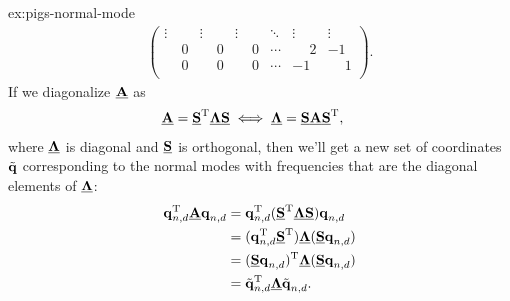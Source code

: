 \begin{DefAnswer}{ex:pigs-normal-mode}
\begin{align}
\begin{pmatrix}
				\vdots & \vdots & \vdots & \ddots & \vdots & \vdots \\
				\phantom{-}0 & \phantom{-}0 & \phantom{-}0 & \cdots & \phantom{-}2 & -1 \\
				\phantom{-}0 & \phantom{-}0 & \phantom{-}0 & \cdots & -1 & \phantom{-}1 \\
			\end{pmatrix}.
	\end{align}
	If we diagonalize $\underline{\bm{\mathbf{A}}}$ as
	\begin{align}
		\mat{A}
		= \mat{S}\trans \mat{\Lambda} \mat{S}
		&\iff
		\mat{\Lambda}
		= \mat{S} \mat{A} \mat{S}\trans,
			\label{eq:nm-diagonalization}
	\end{align}
	where $\underline{\bm{\mathbf{\Lambda}}}$ is diagonal and $\underline{\bm{\mathbf{S}}}$ is orthogonal, then we'll get a new set of coordinates $\tilde{\bm{\mathbf{q}}}$ corresponding to the normal modes with frequencies that are the diagonal elements of $\underline{\bm{\mathbf{\Lambda}}}$:
	\begin{subequations}
	\begin{align}
		\bm{\mathbf{q}}_{n,d}^\mathrm{T} \underline{\bm{\mathbf{A}}} \bm{\mathbf{q}}_{n,d}
		&= \bm{\mathbf{q}}_{n,d}^\mathrm{T} (\underline{\bm{\mathbf{S}}}^\mathrm{T} \underline{\bm{\mathbf{\Lambda}}} \underline{\bm{\mathbf{S}}}) \bm{\mathbf{q}}_{n,d} \\
		&= (\bm{\mathbf{q}}_{n,d}^\mathrm{T} \underline{\bm{\mathbf{S}}}^\mathrm{T}) \underline{\bm{\mathbf{\Lambda}}} (\underline{\bm{\mathbf{S}}} \bm{\mathbf{q}}_{n,d}) \\
		&= (\underline{\bm{\mathbf{S}}} \bm{\mathbf{q}}_{n,d})^\mathrm{T} \underline{\bm{\mathbf{\Lambda}}} (\underline{\bm{\mathbf{S}}} \bm{\mathbf{q}}_{n,d}) \\
		&= \tilde{\bm{\mathbf{q}}}_{n,d}^\mathrm{T} \underline{\bm{\mathbf{\Lambda}}} \tilde{\bm{\mathbf{q}}}_{n,d}.
	\end{align}
	\end{subequations}


\end{DefAnswer}
